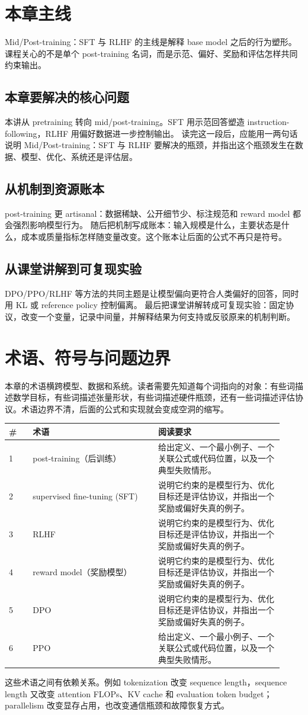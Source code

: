 \documentclass[a4paper]{article}
\begin{document}
\section{本章主线}
Mid/Post-training：SFT 与 RLHF 的主线是解释 base model 之后的行为塑形。课程关心的不是单个 post-training 名词，而是示范、偏好、奖励和评估怎样共同约束输出。
\subsection{本章要解决的核心问题}
本讲从 pretraining 转向 mid/post-training。SFT 用示范回答塑造 instruction-following，RLHF 用偏好数据进一步控制输出。
读完这一段后，应能用一两句话说明 Mid/Post-training：SFT 与 RLHF 要解决的瓶颈，并指出这个瓶颈发生在数据、模型、优化、系统还是评估层。
\subsection{从机制到资源账本}
post-training 更 artisanal：数据稀缺、公开细节少、标注规范和 reward model 都会强烈影响模型行为。
随后把机制写成账本：输入规模是什么，主要状态是什么，成本或质量指标怎样随变量改变。这个账本让后面的公式不再只是符号。
\subsection{从课堂讲解到可复现实验}
DPO/PPO/RLHF 等方法的共同主题是让模型偏向更符合人类偏好的回答，同时用 KL 或 reference policy 控制偏离。
最后把课堂讲解转成可复现实验：固定协议，改变一个变量，记录中间量，并解释结果为何支持或反驳原来的机制判断。
\section{术语、符号与问题边界}
本章的术语横跨模型、数据和系统。读者需要先知道每个词指向的对象：有些词描述数学目标，有些词描述张量形状，有些词描述硬件瓶颈，还有一些词描述评估协议。术语边界不清，后面的公式和实现就会变成空洞的缩写。
\begin{longtable}{p{0.08\linewidth}p{0.42\linewidth}p{0.42\linewidth}}
\toprule
\textbf{\#} & \textbf{术语} & \textbf{阅读要求}\\
\midrule
1 & post-training（后训练） & 给出定义、一个最小例子、一个关联公式或代码位置，以及一个典型失败情形。\\
2 & supervised fine-tuning (SFT) & 说明它约束的是模型行为、优化目标还是评估协议，并指出一个奖励或偏好失真的例子。\\
3 & RLHF & 说明它约束的是模型行为、优化目标还是评估协议，并指出一个奖励或偏好失真的例子。\\
4 & reward model（奖励模型） & 说明它约束的是模型行为、优化目标还是评估协议，并指出一个奖励或偏好失真的例子。\\
5 & DPO & 说明它约束的是模型行为、优化目标还是评估协议，并指出一个奖励或偏好失真的例子。\\
6 & PPO & 给出定义、一个最小例子、一个关联公式或代码位置，以及一个典型失败情形。\\
\bottomrule
\end{longtable}
这些术语之间有依赖关系。例如 tokenization 改变 sequence length，sequence length 又改变 attention FLOPs、KV cache 和 evaluation token budget；parallelism 改变显存占用，也改变通信瓶颈和故障恢复方式。
\end{document}

